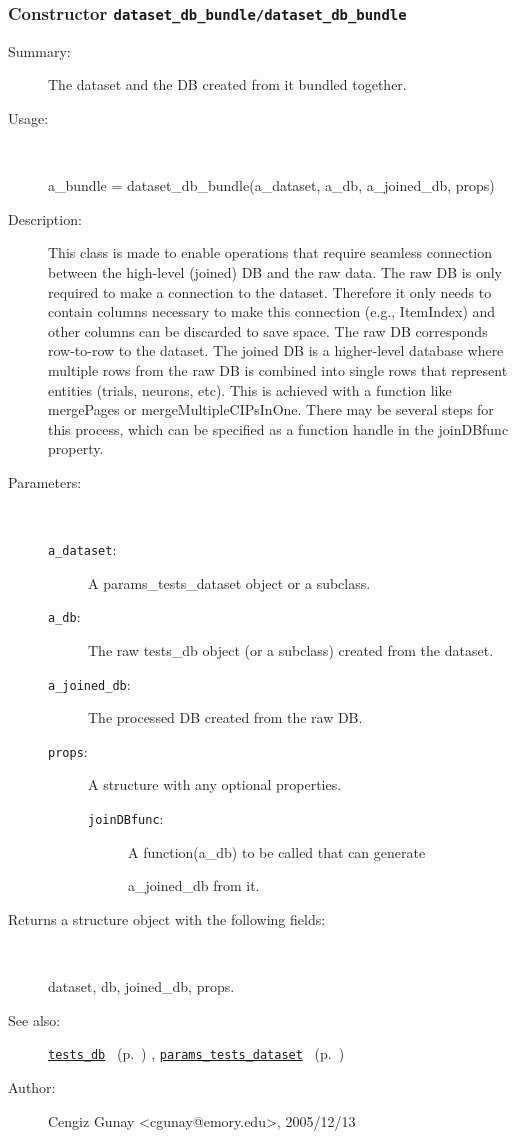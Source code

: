 \subsubsection[Constructor \texttt{dataset\_db\_bundle}]{Constructor \texttt{dataset\_db\_bundle/dataset\_db\_bundle}}%
%
\label{ref_dataset_db_bundle__dataset_db_bundle}%
\hypertarget{ref_dataset_db_bundle__dataset_db_bundle}{}%
\begin{description}
\item[Summary:]The dataset and the DB created from it bundled together.
%
\item[Usage:]~%
\begin{lyxcode}%
a\_bundle = dataset\_db\_bundle(a\_dataset, a\_db, a\_joined\_db, props)
%
\end{lyxcode}%
%
\item[Description:]%
This class is made to enable operations that require seamless connection
 between the high-level (joined) DB and the raw data. The raw DB is only
 required to make a connection to the dataset. Therefore it only needs to
 contain columns necessary to make this connection (e.g., ItemIndex) and
 other columns can be discarded to save space. The raw DB corresponds
 row-to-row to the dataset. The joined DB is a higher-level database where
 multiple rows from the raw DB is combined into single rows that represent
 entities (trials, neurons, etc). This is achieved with a function like
 mergePages or mergeMultipleCIPsInOne. There may be several steps for this
 process, which can be specified as a function handle in the joinDBfunc
 property.
\item[Parameters:]~
\begin{description}%
\item[\texttt{a\_dataset}:]
 A params\_tests\_dataset object or a subclass.
\item[\texttt{a\_db}:]
 The raw tests\_db object (or a subclass) created from the dataset.
\item[\texttt{a\_joined\_db}:]
 The processed DB created from the raw DB.
\item[\texttt{props}:]
 A structure with any optional properties.
\begin{description}%
\item[\texttt{joinDBfunc}:]
 A function(a\_db) to be called that can generate

a\_joined\_db from it.
\end{description}%
\end{description}%
%
\item[Returns a structure object with the following fields:
]~

	dataset, db, joined\_db, props.
%
%
\item[See also:]%
\hyperlink{ref_tests_db}{\texttt{tests\_db}}%
\ (p.~\pageref{ref_tests_db})%
%
, \hyperlink{ref_params_tests_dataset}{\texttt{params\_tests\_dataset}}%
\ (p.~\pageref{ref_params_tests_dataset})%
%
%
\item[Author:]%
Cengiz Gunay <cgunay@emory.edu>, 2005/12/13
%
\end{description}
\methodline%
